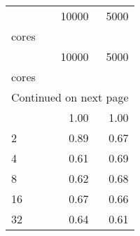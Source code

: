 \begin{longtable}{lrr}
	 \efficiency\\
\toprule
 & 10000 & 5000 \\
cores &  &  \\
\midrule
\endfirsthead
\toprule
 & 10000 & 5000 \\
cores &  &  \\
\midrule
\endhead
\midrule
\multicolumn{3}{r}{Continued on next page} \\
\midrule
\endfoot
\bottomrule
\endlastfoot
1 & 1.00 & 1.00 \\
2 & 0.89 & 0.67 \\
4 & 0.61 & 0.69 \\
8 & 0.62 & 0.68 \\
16 & 0.67 & 0.66 \\
32 & 0.64 & 0.61 \\
\end{longtable}

